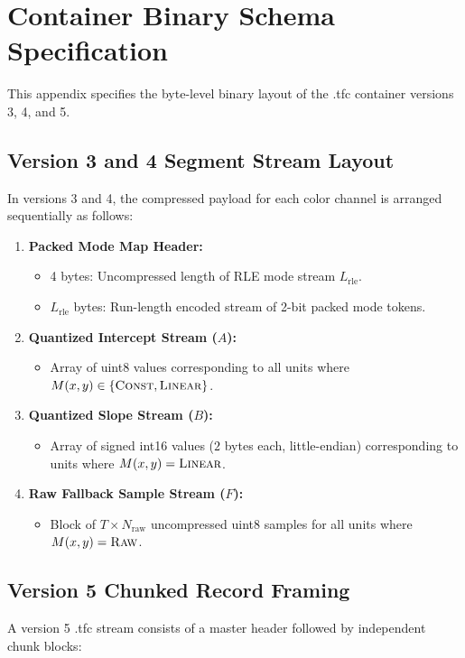 \chapter{Container Binary Schema Specification}
\label{app:schema}

This appendix specifies the byte-level binary layout of the .tfc container versions 3, 4, and 5.

\section{Version 3 and 4 Segment Stream Layout}
In versions 3 and 4, the compressed payload for each color channel is arranged sequentially as follows:
\begin{enumerate}
    \item \textbf{Packed Mode Map Header:}
    \begin{itemize}
        \item 4 bytes: Uncompressed length of RLE mode stream $L_{\text{rle}}$.
        \item $L_{\text{rle}}$ bytes: Run-length encoded stream of 2-bit packed mode tokens.
    \end{itemize}
    \item \textbf{Quantized Intercept Stream ($A$):}
    \begin{itemize}
        \item Array of uint8 values corresponding to all units where $M(x, y) \in \{\textsc{Const}, \textsc{Linear}\}$.
    \end{itemize}
    \item \textbf{Quantized Slope Stream ($B$):}
    \begin{itemize}
        \item Array of signed int16 values ($2$ bytes each, little-endian) corresponding to units where $M(x, y) = \textsc{Linear}$.
    \end{itemize}
    \item \textbf{Raw Fallback Sample Stream ($F$):}
    \begin{itemize}
        \item Block of $T \times N_{\text{raw}}$ uncompressed uint8 samples for all units where $M(x, y) = \textsc{Raw}$.
    \end{itemize}
\end{enumerate}

\section{Version 5 Chunked Record Framing}
A version 5 .tfc stream consists of a master header followed by independent chunk blocks:

